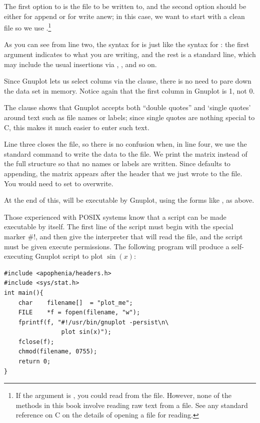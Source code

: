The first option to  is the file to be written to, and
the second option should be either  for append or  for
write anew; in this case, we want to start with a clean file so we use
.\footnote{If the argument is , you could read from the
file. However, none of the methods in this book involve reading raw text
from a file. See any standard reference on C on the details of opening a
file for reading.} 


As you can see from line two, the syntax for  is just like
the syntax for : the first argument indicates to what you
are writing, and the rest is a standard  line, which may
include the usual insertions via , , and so on.

Since Gnuplot lets us select colums via the  clause, there
is no need to pare down the data set in memory.  Notice again that the
first column in Gnuplot is 1, not 0.

The  clause shows that Gnuplot accepts both ``double quotes''
and `single quotes' around text such as file names or labels; since
single quotes are nothing special to C, this makes it much easier to
enter such text.

Line three closes the file, so there is no confusion when, in line four,
we use the standard  command to write the data
to the file. We print the matrix instead of the
full  structure so that no names or labels are written.
Since  defaults to appending, the matrix appears
after the  header that we just wrote to the file.
You would need to set  to overwrite.

At the end of this,  will be executable by
Gnuplot, using the forms like 
, as above.

\treesymbol{} Those experienced with POSIX systems know that a script
can be made executable by itself. The first line of the script must begin
with the special marker \#!, and then give the interpreter that will read
the file, and the script must be given execute permissions. The following
program will produce a self-executing Gnuplot script to plot $\sin(x)$:
\begin{lstlisting}
#include <apophenia/headers.h>
#include <sys/stat.h>
int main(){
    char    filename[]  = "plot_me";
    FILE    *f = fopen(filename, "w");
    fprintf(f, "#!/usr/bin/gnuplot -persist\n\
                plot sin(x)");
    fclose(f);
    chmod(filename, 0755);
    return 0;
}
\end{lstlisting}

